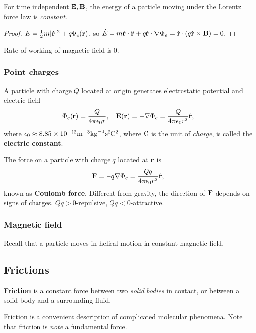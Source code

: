 \begin{proposition}
    For time independent $ {\bf E},{\bf B} $, the energy of a particle moving under the Lorentz force law is \textit{constant}.
\end{proposition}
\begin{proof}
    $ E = \frac{1}{2}m|\dot{{\bf r}}|^2+q\Phi_e({\bf r}) $, so $ \dot{E}=m \dot{{\bf r}} \cdot \ddot{{\bf r}}+q \dot{{\bf r}}\cdot \nabla \Phi_e = \dot{{\bf r}}\cdot (q \dot{{\bf r}}\times {\bf B}) =0. $
\end{proof}
\begin{note}
    Rate of working of magnetic field is 0.
\end{note}

\subsubsection{Point charges}
A particle with charge $Q$ located at origin generates electrostatic potential and electric field
\[
    \Phi_e({\bf r}) = \frac{Q}{4\pi \epsilon_0 r},\quad {\bf E}({\bf r}) = -\nabla \Phi_e = \frac{Q}{4\pi \epsilon_0 r^2} \hat{{\bf r}},
\]
where $ \epsilon_0 \approx 8.85 \times 10^{-12}\mathrm{m}^{-3}\mathrm{kg}^{-1}\mathrm{s}^2\mathrm{C}^2 $, where $ \mathrm{C} $ is the unit of \textit{charge}, is called the \textbf{electric constant}.

The force on a particle with charge $q$ located at ${\bf r}$ is 
\[
    \mathbf{F} = -q \nabla \Phi_e = \frac{Qq}{4\pi \epsilon_0 r^2}\hat{{\bf r}},
\]
known as \textbf{Coulomb force}. Different from gravity, the direction of ${\bf F}$ depends on signs of charges. $ Qq>0 $-repulsive, $ Qq<0 $-attractive.

\subsubsection{Magnetic field}
Recall that a particle moves in helical motion in constant magnetic field.

\subsection{Frictions}
\begin{definition}
    \textbf{Friction} is a constant force between two \textit{solid bodies} in contact, or between a solid body and a surrounding fluid.
\end{definition}
\begin{note}
    Friction is a convenient description of complicated molecular phenomena. Note that friction is \textit{note} a fundamental force.
\end{note}


